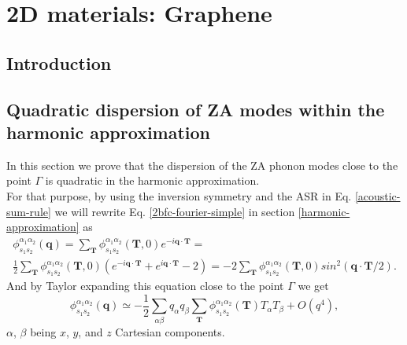 
\chapter{2D materials: Graphene} %

\label{Chapter8} %




\section{Introduction}


\section{Quadratic dispersion of ZA modes within the harmonic approximation}

In this section we prove that the dispersion of the ZA phonon modes close to the point $\Gamma$ is quadratic in the 
harmonic approximation. \\

For that purpose, by using the inversion symmetry and the ASR in Eq. \ref{acoustic-sum-rule} we will rewrite Eq. \ref{2bfc-fourier-simple} in section \ref{harmonic-approximation} as
\begin{multline}
 \phi_{s_{1}s_{2}}^{\alpha_{1}\alpha_{2}}(\mathbf{q})=\sum_{\mathbf{T}}\phi_{s_{1}s_{2}}^{\alpha_{1}\alpha_{2}}(\mathbf{T},0)e^{-i\mathbf{q}\cdot\mathbf{T}}=\\\frac{1}{2}\sum_{\mathbf{T}}\phi_{s_{1}s_{2}}^{\alpha_{1}\alpha_{2}}(\mathbf{T},0)(e^{-i\mathbf{q}\cdot\mathbf{T}}+e^{i\mathbf{q}\cdot\mathbf{T}}-2)=-2\sum_{\mathbf{T}}\phi_{s_{1}s_{2}}^{\alpha_{1}\alpha_{2}}(\mathbf{T},0)sin^{2}(\mathbf{q}\cdot\mathbf{T}/2).
\end{multline}
And by Taylor expanding this equation close to the point $\Gamma$ we get
\begin{equation}
\label{need-zero}
\phi_{s_{1}s_{2}}^{\alpha_{1}\alpha_{2}}(\mathbf{q})\simeq -\frac{1}{2}\sum_{\alpha\beta}q_{\alpha}q_{\beta}\sum_{\mathbf{T}}\phi_{s_{1}s_{2}}^{\alpha_{1}\alpha_{2}}(\mathbf{T})T_{\alpha}T_{\beta}+O(q^{4}),
\end{equation} 
$\alpha$, $\beta$ being $x$, $y$, and $z$ Cartesian components. \\

